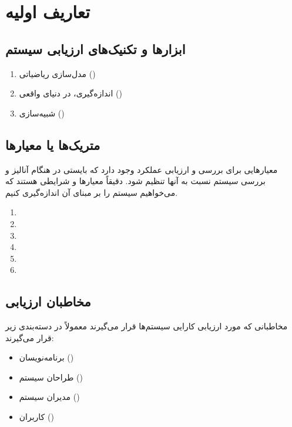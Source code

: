 \section{تعاریف اولیه}

\subsection{ابزار‌ها و تکنیک‌های ارزیابی سیستم}

\begin{enumerate}
    \item مدل‌سازی ریاضیاتی ()
    \item اندازه‌گیری، در دنیای واقعی ()
    \item شبیه‌سازی ()
\end{enumerate}

\subsection{متریک‌ها یا معیار‌ها}

 معیار‌هایی برای بررسی و ارزیابی عملکرد وجود دارد که بایستی در هنگام آنالیز و
 بررسی سیستم نسبت به آنها تنظیم شود. دقیقاً معیار‌ها و شرایطی هستند که می‌خواهیم
 سیستم را بر مبنای آن اندازه‌گیری کنیم.

\begin{enumerate}
    \item {}
    \item {}
    \item {}
    \item {}
    \item {}
    \item {}
\end{enumerate}

\subsection{مخاطبان ارزیابی}

مخاطبانی که مورد ارزیابی کارایی سیستم‌ها قرار می‌گیرند معمولاً در دسته‌بندی زیر
قرار می‌گیرند:

\begin{itemize}
    \item برنامه‌نویسان ()
    \item طراحان سیستم ()
    \item مدیران سیستم ()
    \item کاربران ()
\end{itemize}

